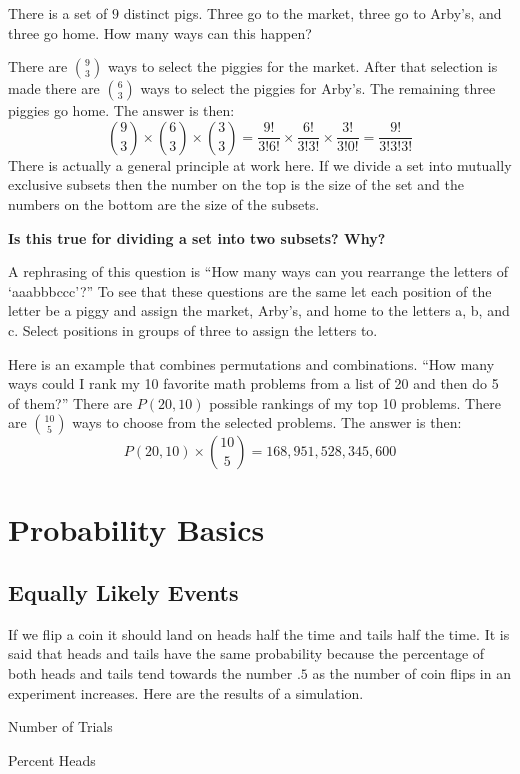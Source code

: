 \documentclass[]{book}
\begin{document}
There is a set of \(9\) distinct pigs. Three go to the market, three go
to Arby's, and three go home. How many ways can this happen?

There are \(9 \choose 3\) ways to select the piggies for the market.
After that selection is made there are \(6 \choose 3\) ways to select
the piggies for Arby's. The remaining three piggies go home. The answer
is then:
\[{9 \choose 3}\times{6 \choose 3} \times {3 \choose 3} = \frac{9!}{3!6!}\times \frac{6!}{3!3!} \times \frac{3!}{3!0!} = \frac{9!}{3!3!3!}\]
There is actually a general principle at work here. If we divide a set
into mutually exclusive subsets then the number on the top is the size
of the set and the numbers on the bottom are the size of the subsets.

\textbf{Is this true for dividing a set into two subsets? Why?}

A rephrasing of this question is ``How many ways can you rearrange the
letters of `aaabbbccc'?'' To see that these questions are the same let
each position of the letter be a piggy and assign the market, Arby's,
and home to the letters a, b, and c. Select positions in groups of three
to assign the letters to.

Here is an example that combines permutations and combinations. ``How
many ways could I rank my 10 favorite math problems from a list of 20
and then do 5 of them?'' There are \(P(20,10)\) possible rankings of my
top 10 problems. There are \(10 \choose 5\) ways to choose from the
selected problems. The answer is then:
\[P(20,10)\times{10 \choose 5} = 168,951,528,345,600\]

\chapter{Probability Basics}\label{probability-basics}

\section{Equally Likely Events}\label{equally-likely-events}

If we flip a coin it should land on heads half the time and tails half
the time. It is said that heads and tails have the same probability
because the percentage of both heads and tails tend towards the number
\(.5\) as the number of coin flips in an experiment increases. Here are
the results of a simulation.

Number of Trials

Percent Heads
\end{document}
